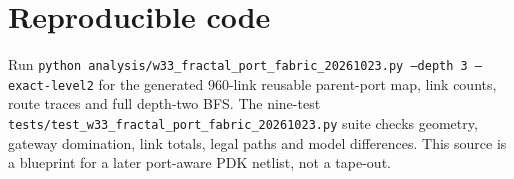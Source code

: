 \documentclass[10pt]{article}
\begin{document}
\section{Reproducible code}
Run \texttt{python analysis/w33\_fractal\_port\_fabric\_20261023.py --depth 3 --exact-level2} for the generated 960-link reusable parent-port map, link counts, route traces and full depth-two BFS. The nine-test \texttt{tests/test\_w33\_fractal\_port\_fabric\_20261023.py} suite checks geometry, gateway domination, link totals, legal paths and model differences. This source is a blueprint for a later port-aware PDK netlist, not a tape-out.
\end{document}
